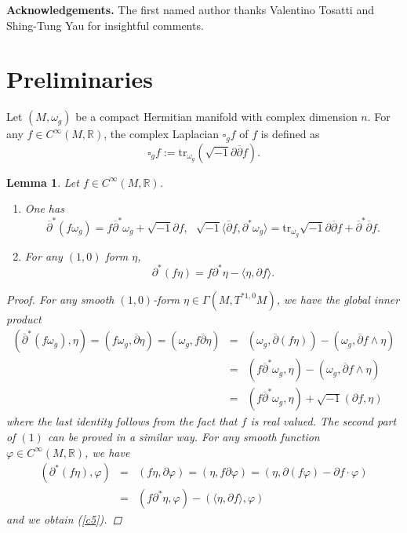 \documentclass[12pt]{amsart}
\newcommand\bp{{\bar\partial}}
\theoremstyle{plain}
\newtheorem{lemma}[thm]{Lemma}
\theoremstyle{definition}
\newcommand{\bproof}{\begin{proof}}
\newcommand{\eproof}{\end{proof}}
\newcommand{\elemma}{\end{lemma}}
\newcommand{\blemma}{\begin{lemma}}
\newcommand{\la}{\langle}
\newcommand{\ra}{\rangle}
\newcommand{\sq}{\sqrt{-1}}
\newcommand{\p}{\partial}
\renewcommand{\bar}{\overline}
\renewcommand{\phi}{\varphi}
\newcommand{\beq}{\begin{equation}}
\newcommand{\eeq}{\end{equation}}
\newcommand{\ee}{\end{eqnarray*}}
\newcommand{\be}{\begin{eqnarray*}}
\newcommand{\bd}{\begin{enumerate}}
\newcommand{\ed}{\end{enumerate}}
\renewcommand{\bp}{\bar{\partial}}
\renewcommand{\>}{\rightarrow}
\newcommand{\R}{{\mathbb R}}
\renewcommand{\#}{\sharp}
\newcommand{\tr}{\mathrm{tr}}
\numberwithin{equation}{section} %
\begin{document}
 \noindent \textbf{Acknowledgements.} The first named  author thanks  Valentino Tosatti and Shing-Tung Yau for insightful comments.


\baselineskip

    \section{Preliminaries}




    Let $(M,\omega_g)$ be a compact Hermitian manifold with complex dimension $n$. For any $f\in C^\infty(M,\R)$, the complex Laplacian $\square_g f$ of $f$ is defined as
    \beq
    \square_g f:=\tr_{\omega_g}\left(\sq\p\bp f\right).
    \eeq


    \blemma \label{lem1}  Let $f\in C^\infty(M,\R)$.

    \bd \item One has  \beq  \bp^*(f\omega_g)=f\bp^*\omega_g+\sq\p f,\ \ \  \sq\la\bp f,\p^*\omega_g\ra=\tr_{\omega_g}\sq\p\bp f+\bp^*\bp f. \label{c1}\eeq

    \item  For any $(1,0)$ form $\eta$,  \beq \p^*(f\eta)=f\p^*\eta-\la \eta,\p
    f\ra.\label{c5}\eeq
    \ed


    \bproof For any smooth $(1,0)$-form $\eta\in \Gamma(M,T^{*1,0}M)$,
    we have the global inner product \be
    \left(\bp^*(f\omega_g),\eta\right)=\left(f\omega_g,\bp\eta\right)
    =\left(\omega_g,
    f\bp\eta\right)&=&\left(\omega_g,\bp(f\eta)\right)-\left(\omega_g,\bp f\wedge
    \eta\right)\\
    &=&\left(f\bp^*\omega_g,\eta\right)-\left(\omega_g,\bp f\wedge
    \eta\right)\\
    &=&\left(f\bp^*\omega_g,\eta\right)+\sq\left(\p f, \eta\right) \ee
    where the last identity follows from the fact that $f$ is real
    valued. The second part of $(1)$ can be proved in a similar way.  For any smooth function $\phi\in
    C^\infty(M,\R)$, we have  \be
    \left(\p^*(f\eta),\phi\right)&=&\left(f\eta,\p\phi\right)=\left(\eta,
    f\p\phi\right)=\left(\eta, \p(f\phi)-\p f\cdot \phi\right)\\
    &=&\left(f\p^*\eta,\phi\right)-\left(\la\eta, \p f\ra,
    \phi\right)\ee and we obtain (\ref{c5}). \eproof \elemma
\end{document}
